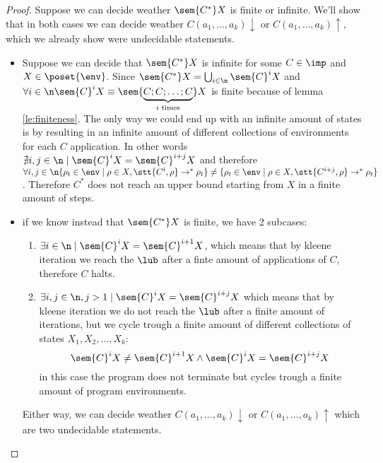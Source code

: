 \begin{proof}
  Suppose we can decide weather \(\sem{C^*}X\) is finite or
  infinite. We'll show that in both cases we can decide weather
  \(C(a_1, \dots, a_k)\downarrow\) or \(C(a_1, \dots, a_k)\uparrow\),
  which we already show were undecidable statements.
  \begin{itemize}
  \item Suppose we can decide that \(\sem{C^*}X\) is infinite for some
    \(C\in\imp\) and \(X\in\poset{\env}\). Since \(\sem{C^*}X =
    \bigcup_{i\in\n}\sem{C}^i X\) and \(\forall i \in \n \sem{C}^i X
    \equiv \sem{\underbrace{C;C;\dots;C}_{i\text{ times}}}X\) is
    finite because of lemma \ref{le:finiteness}. The only way we could
    end up with an infinite amount of states is by resulting in an
    infinite amount of different collections of environments for each
    \(C\) application. In other words \(\nexists i,j \in \n \mid
    \sem{C}^i X = \sem{C}^{i+j}X\) and therefore \(\forall i,j\in\n
    \{\rho_t \in \env \mid \rho \in X , \stt{C^i, \rho} \to^* \rho_t\}
    \neq \{\rho_t \in \env \mid \rho \in X , \stt{C^{i+j}, \rho} \to^*
    \rho_t\}\). Therefore \(C^*\) does not reach an upper bound
    starting from \(X\) in a finite amount of steps.
  \item if we know instead that \(\sem{C^*}X\) is finite, we have 2
    subcases:
    \begin{enumerate}
    \item \(\exists i \in\n \mid \sem{C}^iX = \sem{C}^{i+1}X\), which
      means that by kleene iteration we reach the \(\lub\) after a
      finte amount of applications of \(C\), therefore \(C\) halts.
    \item \(\exists i,j \in \n, j > 1 \mid \sem{C}^iX = \sem{C}^{i +
      j}X\) which means that by kleene iteration we do not reach the
      \(\lub\) after a finite amount of iterations, but we cycle
      trough a finite amount of different collections of states \(X_1,
      X_2, \dots, X_k\): \[\sem{C}^iX \neq \sem{C}^{i+1}X \wedge
      \sem{C}^iX = \sem{C}^{i+j}X\] in this case the program does not
      terminate but cycles trough a finite amount of program
      environments.
    \end{enumerate}

    Either way, we can decide weather \(C(a_1, \dots, a_k)
    \downarrow\) or \(C(a_1, \dots, a_k) \uparrow\) which are two
    undecidable statements.
  \end{itemize}
\end{proof}
